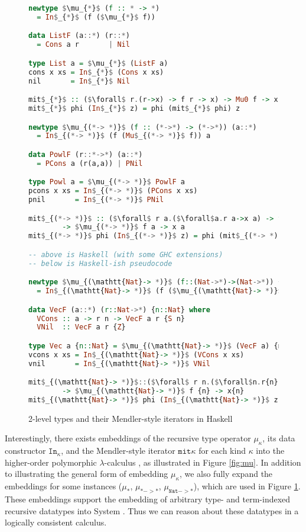 \begin{figure}\vspace*{-8pt}
\begin{lstlisting}[basicstyle={\ttfamily\small},language=Haskell,mathescape]
newtype $\mu_{*}$ (f :: * -> *)
  = In$_{*}$ (f ($\mu_{*}$ f))

data ListF (a::*) (r::*)
  = Cons a r       | Nil

type List a = $\mu_{*}$ (ListF a)
cons x xs = In$_{*}$ (Cons x xs)
nil       = In$_{*}$ Nil

mit$_{*}$ :: ($\forall$ r.(r->x) -> f r -> x) -> Mu0 f -> x
mit$_{*}$ phi (In$_{*}$ z) = phi (mit$_{*}$ phi) z

newtype $\mu_{(*-> *)}$ (f :: (*->*) -> (*->*)) (a::*)
  = In$_{(*-> *)}$ (f (Mu$_{(*-> *)}$ f)) a

data PowlF (r::*->*) (a::*)
  = PCons a (r(a,a)) | PNil

type Powl a = $\mu_{(*-> *)}$ PowlF a
pcons x xs = In$_{(*-> *)}$ (PCons x xs)
pnil       = In$_{(*-> *)}$ PNil

mit$_{(*-> *)}$ :: ($\forall$ r a.($\forall$a.r a->x a) -> f r a -> x a)
        -> $\mu_{(*-> *)}$ f a -> x a
mit$_{(*-> *)}$ phi (In$_{(*-> *)}$ z) = phi (mit$_{(*-> *)}$ phi) z

-- above is Haskell (with some GHC extensions)
-- below is Haskell-ish pseudocode

newtype $\mu_{(\mathtt{Nat}-> *)}$ (f::(Nat->*)->(Nat->*)) {n::Nat}
  = In$_{(\mathtt{Nat}-> *)}$ (f ($\mu_{(\mathtt{Nat}-> *)}$ f)) {n}

data VecF (a::*) (r::Nat->*) {n::Nat} where
  VCons :: a -> r n -> VecF a r {S n}
  VNil  :: VecF a r {Z}

type Vec a {n::Nat} = $\mu_{(\mathtt{Nat}-> *)}$ (VecF a) {n}
vcons x xs = In$_{(\mathtt{Nat}-> *)}$ (VCons x xs)
vnil       = In$_{(\mathtt{Nat}-> *)}$ VNil

mit$_{(\mathtt{Nat}-> *)}$::($\forall$ r n.($\forall$n.r{n}->x{n})->f r {n}->x{n})
        -> $\mu_{(\mathtt{Nat}-> *)}$ f {n} -> x{n}
mit$_{(\mathtt{Nat}-> *)}$ phi (In$_{(\mathtt{Nat}-> *)}$ z) = phi (mit$_{(\mathtt{Nat}-> *)}$ phi) z
\end{lstlisting}
\caption{2-level types and their Mendler-style iterators in Haskell}
\label{fig:twoleveltypes}
\end{figure}

Interestingly, there exists embeddings of the recursive type operator
$\mu_\kappa$, its data constructor $\mathtt{In}_\kappa$, and
the Mendler-style iterator $\mathtt{mit}\kappa$ for each kind $\kappa$
into the higher-order polymorphic $\lambda$-calculus \Fi, as illustrated
in Figure \ref{fig:mu}. In addition to illustrating the general form of
embedding $\mu_\kappa$, we also fully expand the embeddings for some
instances ($\mu_{*}$, $\mu_{*->*}$, $\mu_{\mathtt{Nat}->*}$), which are
used in Figure \ref{fig:twoleveltypes}. These embeddings support the embedding
of arbitrary type- and term-indexed recursive datatypes into System \Fi.
Thus we can reason about these datatypes in a logically consistent calculus.

